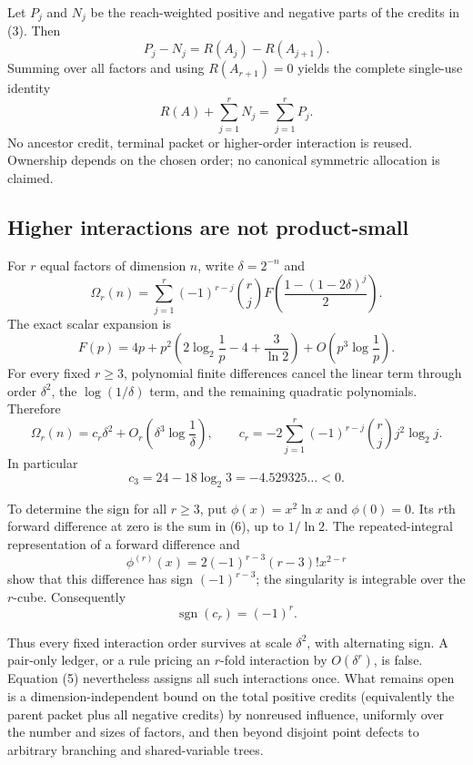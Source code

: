Let $P_j$ and $N_j$ be the reach-weighted positive and negative parts of the
credits in (3).  Then
\[
 P_j-N_j=R(A_j)-R(A_{j+1}).
\]
Summing over all factors and using $R(A_{r+1})=0$ yields the complete
single-use identity
\begin{equation}
 \boxed{R(A)+\sum_{j=1}^rN_j=\sum_{j=1}^rP_j.}           \tag{5}
\end{equation}
No ancestor credit, terminal packet or higher-order interaction is reused.
Ownership depends on the chosen order; no canonical symmetric allocation is
claimed.

\subsection*{Higher interactions are not product-small}

For $r$ equal factors of dimension $n$, write $\delta=2^{-n}$ and
\[
 \Omega_r(n)=\sum_{j=1}^r(-1)^{r-j}\binom rj
 F\!\left(\frac{1-(1-2\delta)^j}{2}\right).
\]
The exact scalar expansion is
\[
 F(p)=4p+p^2\left(2\log_2\frac1p-4+\frac3{\ln2}\right)
 +O\!\left(p^3\log\frac1p\right).
\]
For every fixed $r\ge3$, polynomial finite differences cancel the linear
term through order $\delta^2$, the $\log(1/\delta)$ term, and the remaining
quadratic polynomials.  Therefore
\begin{equation}
 \boxed{
 \Omega_r(n)=c_r\delta^2+O_r\!\left(\delta^3\log\frac1\delta\right),
 \qquad
 c_r=-2\sum_{j=1}^r(-1)^{r-j}\binom rj j^2\log_2j.}       \tag{6}
\end{equation}
In particular
\[
 c_3=24-18\log_2 3=-4.529325\ldots<0.
\]

To determine the sign for all $r\ge3$, put $\phi(x)=x^2\ln x$ and
$\phi(0)=0$.  Its $r$th forward difference at zero is the sum in (6),
up to $1/\ln2$.  The repeated-integral representation of a forward
difference and
\[
 \phi^{(r)}(x)=2(-1)^{r-3}(r-3)!x^{2-r}
\]
show that this difference has sign $(-1)^{r-3}$; the singularity is
integrable over the $r$-cube.  Consequently
\begin{equation}
 \operatorname{sgn}(c_r)=(-1)^r.                         \tag{7}
\end{equation}

Thus every fixed interaction order survives at scale $\delta^2$, with
alternating sign.  A pair-only ledger, or a rule pricing an $r$-fold
interaction by $O(\delta^r)$, is false.  Equation (5) nevertheless assigns
all such interactions once.  What remains open is a dimension-independent
bound on the total positive credits (equivalently the parent packet plus all
negative credits) by nonreused influence, uniformly over the number and sizes
of factors, and then beyond disjoint point defects to arbitrary branching and
shared-variable trees.
